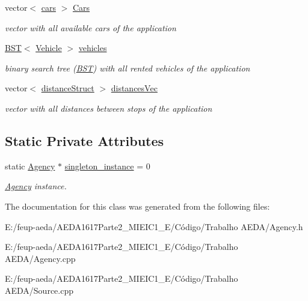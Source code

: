 \begin{Indent}
\begin{DoxyCompactItemize}
vector$<$ \hyperlink{structcars}{cars} $>$ \hyperlink{group___agency_ga2fc5f0f3c78faed2a20b3dbcf276a730}{Cars}
\begin{DoxyCompactList}\small\item\em vector with all available cars of the application \end{DoxyCompactList}\item 
\hyperlink{class_b_s_t}{B\+ST}$<$ \hyperlink{class_vehicle}{Vehicle} $>$ \hyperlink{group___agency_gaacec2af5f5b458ab7103225e07b780cf}{vehicles}
\begin{DoxyCompactList}\small\item\em binary search tree (\hyperlink{class_b_s_t}{B\+ST}) with all rented vehicles of the application \end{DoxyCompactList}\item 
vector$<$ \hyperlink{structdistance_struct}{distance\+Struct} $>$ \hyperlink{group___agency_ga53eb5336f6197d5643f9489f2efc0467}{distances\+Vec}
\begin{DoxyCompactList}\small\item\em vector with all distances between stops of the application \end{DoxyCompactList}\end{DoxyCompactItemize}
\end{Indent}
\subsection*{Static Private Attributes}
\begin{DoxyCompactItemize}
\item 
static \hyperlink{class_agency}{Agency} $\ast$ \hyperlink{group___agency_ga24c6ae11e29cdf5eefc6a5c94783b90e}{singleton\+\_\+instance} = 0
\begin{DoxyCompactList}\small\item\em \hyperlink{class_agency}{Agency} instance. \end{DoxyCompactList}\end{DoxyCompactItemize}


The documentation for this class was generated from the following files\+:\begin{DoxyCompactItemize}
\item 
E\+:/feup-\/aeda/\+A\+E\+D\+A1617\+Parte2\+\_\+M\+I\+E\+I\+C1\+\_\+\+E/\+Código/\+Trabalho A\+E\+D\+A/Agency.\+h\item 
E\+:/feup-\/aeda/\+A\+E\+D\+A1617\+Parte2\+\_\+M\+I\+E\+I\+C1\+\_\+\+E/\+Código/\+Trabalho A\+E\+D\+A/Agency.\+cpp\item 
E\+:/feup-\/aeda/\+A\+E\+D\+A1617\+Parte2\+\_\+M\+I\+E\+I\+C1\+\_\+\+E/\+Código/\+Trabalho A\+E\+D\+A/Source.\+cpp\end{DoxyCompactItemize}
